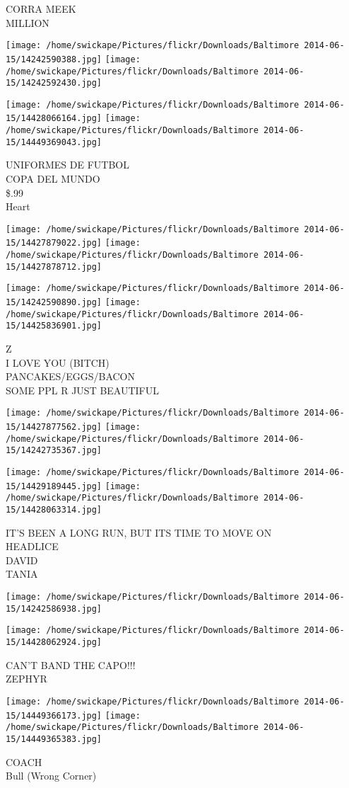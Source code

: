 \documentclass[10pt,letterpaper]{article}
\begin{document}
CORRA MEEK\\
MILLION
\pagebreak

\texttt{[image: /home/swickape/Pictures/flickr/Downloads/Baltimore 2014-06-15/14242590388.jpg]}
\texttt{[image: /home/swickape/Pictures/flickr/Downloads/Baltimore 2014-06-15/14242592430.jpg]}

\texttt{[image: /home/swickape/Pictures/flickr/Downloads/Baltimore 2014-06-15/14428066164.jpg]}
\texttt{[image: /home/swickape/Pictures/flickr/Downloads/Baltimore 2014-06-15/14449369043.jpg]}

UNIFORMES DE FUTBOL\\
COPA DEL MUNDO\\
\$.99\\
Heart
\pagebreak

\texttt{[image: /home/swickape/Pictures/flickr/Downloads/Baltimore 2014-06-15/14427879022.jpg]}
\texttt{[image: /home/swickape/Pictures/flickr/Downloads/Baltimore 2014-06-15/14427878712.jpg]}

\texttt{[image: /home/swickape/Pictures/flickr/Downloads/Baltimore 2014-06-15/14242590890.jpg]}
\texttt{[image: /home/swickape/Pictures/flickr/Downloads/Baltimore 2014-06-15/14425836901.jpg]}

Z\\
I LOVE YOU (BITCH)\\
PANCAKES/EGGS/BACON\\
SOME PPL R JUST BEAUTIFUL
\pagebreak

\texttt{[image: /home/swickape/Pictures/flickr/Downloads/Baltimore 2014-06-15/14427877562.jpg]}
\texttt{[image: /home/swickape/Pictures/flickr/Downloads/Baltimore 2014-06-15/14242735367.jpg]}

\texttt{[image: /home/swickape/Pictures/flickr/Downloads/Baltimore 2014-06-15/14429189445.jpg]}
\texttt{[image: /home/swickape/Pictures/flickr/Downloads/Baltimore 2014-06-15/14428063314.jpg]}

IT'S BEEN A LONG RUN, BUT ITS TIME TO MOVE ON\\
HEADLICE\\
DAVID\\
TANIA
\pagebreak

\texttt{[image: /home/swickape/Pictures/flickr/Downloads/Baltimore 2014-06-15/14242586938.jpg]}

\vspace{0.25in}
\texttt{[image: /home/swickape/Pictures/flickr/Downloads/Baltimore 2014-06-15/14428062924.jpg]}

CAN'T BAND THE CAPO!!!\\
ZEPHYR
\pagebreak

\texttt{[image: /home/swickape/Pictures/flickr/Downloads/Baltimore 2014-06-15/14449366173.jpg]}
\texttt{[image: /home/swickape/Pictures/flickr/Downloads/Baltimore 2014-06-15/14449365383.jpg]}

COACH\\
Bull (Wrong Corner)
\pagebreak
\end{document}
